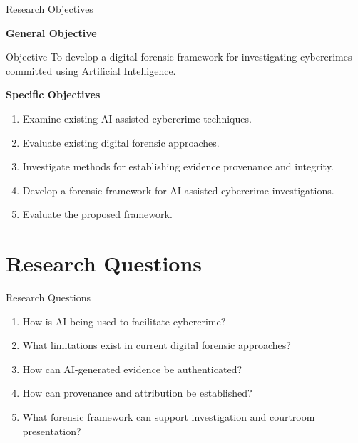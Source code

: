 \documentclass[aspectratio=169,11pt]{beamer}
\begin{document}
	\begin{frame}{Research Objectives}
		
		\textbf{General Objective}
		
		\begin{block}{Objective}
			To develop a digital forensic framework for investigating
			cybercrimes committed using Artificial Intelligence.
		\end{block}
		
		\vspace{0.4cm}
		
		\textbf{Specific Objectives}
		
		\begin{enumerate}
			
			\item Examine existing AI-assisted cybercrime techniques.
			
			\item Evaluate existing digital forensic approaches.
			
			\item Investigate methods for establishing evidence
			provenance and integrity.
			
			\item Develop a forensic framework for AI-assisted
			cybercrime investigations.
			
			\item Evaluate the proposed framework.
			
		\end{enumerate}
		
	\end{frame}
	
	
	\section{Research Questions}
	
	\begin{frame}{Research Questions}
		
		\begin{enumerate}
			
			\item How is AI being used to facilitate cybercrime?
			
			\item What limitations exist in current digital forensic
			approaches?
			
			\item How can AI-generated evidence be authenticated?
			
			\item How can provenance and attribution be established?
			
			\item What forensic framework can support investigation
			and courtroom presentation?
			
		\end{enumerate}
		
	\end{frame}
	
\end{document}

